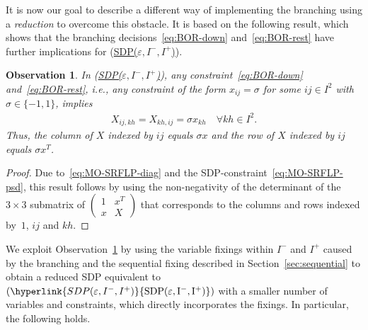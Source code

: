 \documentclass{article}
\newcommand{\myrefmath}[1]{(\hyperlink{#1}{\mathrm{#1}})}
\newcommand{\myref}[1]{\textnormal{(\hyperlink{#1}{#1}})}
\newtheorem{observation}[theorem]{Observation}
\begin{document}
It is now our goal to describe a different way of implementing the branching using a \emph{reduction} to overcome this obstacle.
It is based on the following result, which shows that the branching decisions~\eqref{eq:BOR-down} and~\eqref{eq:BOR-rest} have further implications for \myref{SDP($\varepsilon,I^-,I^+$)}.
\begin{observation}
\label{obs:red}
In \myref{SDP($\varepsilon,I^-,I^+$)}, any constraint~\eqref{eq:BOR-down} and~\eqref{eq:BOR-rest}, i.e., any constraint of the form $x_{ij} = \sigma$ for some $ij \in I^2$ with $\sigma \in \{-1,1\}$, implies 
\begin{align*}
    X_{ij,kh} = X_{kh,ij} = \sigma x_{kh} \quad \forall kh \in I^2.
\end{align*} 
Thus, the column of $X$ indexed by $ij$ equals $\sigma x$ and the row of $X$ indexed by $ij$ equals $\sigma x^T$.
\end{observation}
\begin{proof}
Due to~\eqref{eq:MO-SRFLP-diag} and the SDP-constraint~\eqref{eq:MO-SRFLP-psd}, this result follows 
by using the non-negativity of the determinant of the $3\times3$ submatrix of 
$\begin{pmatrix}
1 & x^T \\
x & X
\end{pmatrix}$ 
that corresponds to the columns and rows indexed by~$1$, $ij$ and $kh$. 
\end{proof}

We exploit Observation~\ref{obs:red} by using the variable fixings within $I^-$ and $I^+$ caused by the branching and the sequential fixing described in Section~\ref{sec:sequential} to obtain a reduced SDP equivalent to $\myrefmath{SDP(\varepsilon,I^-,I^+)}$ with a smaller number of variables and constraints, which directly incorporates the fixings. 
In particular, the following holds.
\end{document}
